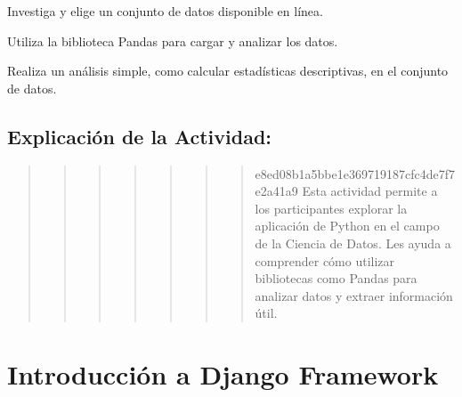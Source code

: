\documentclass[
  a4paper,
  onepage,
  openany]{scrreprt}
\begin{document}
\begin{tcolorbox}[enhanced jigsaw, breakable, opacityback=0, toptitle=1mm, coltitle=black, toprule=.15mm, rightrule=.15mm, colframe=quarto-callout-important-color-frame, opacitybacktitle=0.6, arc=.35mm, title=\textcolor{quarto-callout-important-color}{\faExclamation}\hspace{0.5em}{Actividad Práctica:}, titlerule=0mm, colbacktitle=quarto-callout-important-color!10!white, bottomtitle=1mm, bottomrule=.15mm, colback=white, left=2mm, leftrule=.75mm]

Investiga y elige un conjunto de datos disponible en línea.

Utiliza la biblioteca Pandas para cargar y analizar los datos.

Realiza un análisis simple, como calcular estadísticas descriptivas, en
el conjunto de datos.

\end{tcolorbox}

\hypertarget{explicaciuxf3n-de-la-actividad-79}{%
\section{Explicación de la
Actividad:}\label{explicaciuxf3n-de-la-actividad-79}}

\begin{quote}
\begin{quote}
\begin{quote}
\begin{quote}
\begin{quote}
\begin{quote}
\begin{quote}
e8ed08b1a5bbe1e369719187cfc4de7f7e2a41a9 Esta actividad permite a los
participantes explorar la aplicación de Python en el campo de la Ciencia
de Datos. Les ayuda a comprender cómo utilizar bibliotecas como Pandas
para analizar datos y extraer información útil.
\end{quote}
\end{quote}
\end{quote}
\end{quote}
\end{quote}
\end{quote}
\end{quote}

\hypertarget{introducciuxf3n-a-django-framework}{%
\chapter{Introducción a Django
Framework}\label{introducciuxf3n-a-django-framework}}
\end{document}
